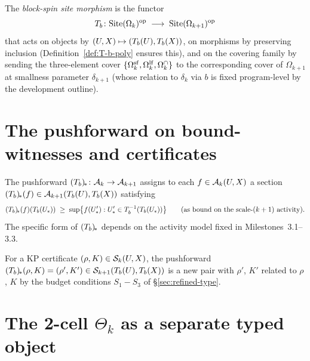 \begin{definition}
\label{def:site-morphism}
The \emph{block-spin site morphism} is the functor
\begin{equation*}
  T_b \colon \mathrm{Site}(\Omega_k)^{\mathrm{op}} \;\longrightarrow\; \mathrm{Site}(\Omega_{k+1})^{\mathrm{op}}
\end{equation*}
that acts on objects by $(U, X) \mapsto (T_b(U), T_b(X))$, on morphisms by preserving inclusion (Definition~\ref{def:T-b-poly} ensures this), and on the covering family by sending the three-element cover $\{\Omega_k^{\mathrm{sf}}, \Omega_k^{\mathrm{lf}}, \Omega_k^{\cap}\}$ to the corresponding cover of $\Omega_{k+1}$ at smallness parameter $\delta_{k+1}$ (whose relation to $\delta_k$ via $b$ is fixed program-level by the development outline).
\end{definition}

\section{The pushforward on bound-witnesses and certificates}
\label{sec:pushforward}

\begin{definition}
\label{def:pushforward-A}
The pushforward $(T_b)_{\!*} \colon \mathcal{A}_k \to \mathcal{A}_{k+1}$ assigns to each $f \in \mathcal{A}_k(U, X)$ a section $(T_b)_{\!*}(f) \in \mathcal{A}_{k+1}(T_b(U), T_b(X))$ satisfying
\begin{equation*}
  (T_b)_{\!*}(f)(T_b(U_*)) \;\ge\; \sup\bigl\{ f(U_*') : U_*' \in T_b^{-1}(T_b(U_*)) \bigr\}
  \qquad \text{(as bound on the scale-$(k+1)$ activity).}
\end{equation*}
The specific form of $(T_b)_{\!*}$ depends on the activity model fixed in Milestones~3.1--3.3.
\end{definition}

\begin{definition}
\label{def:pushforward-S}
For a KP certificate $(\rho, K) \in \mathcal{S}_k(U, X)$, the pushforward $(T_b)_{\!*}(\rho, K) = (\rho', K') \in \mathcal{S}_{k+1}(T_b(U), T_b(X))$ is a new pair with $\rho'$, $K'$ related to $\rho$, $K$ by the budget conditions $S_1\!-\!S_3$ of \S\ref{sec:refined-type}.
\end{definition}

\section{The 2-cell $\Theta_k$ as a separate typed object}
\label{sec:two-cell}

